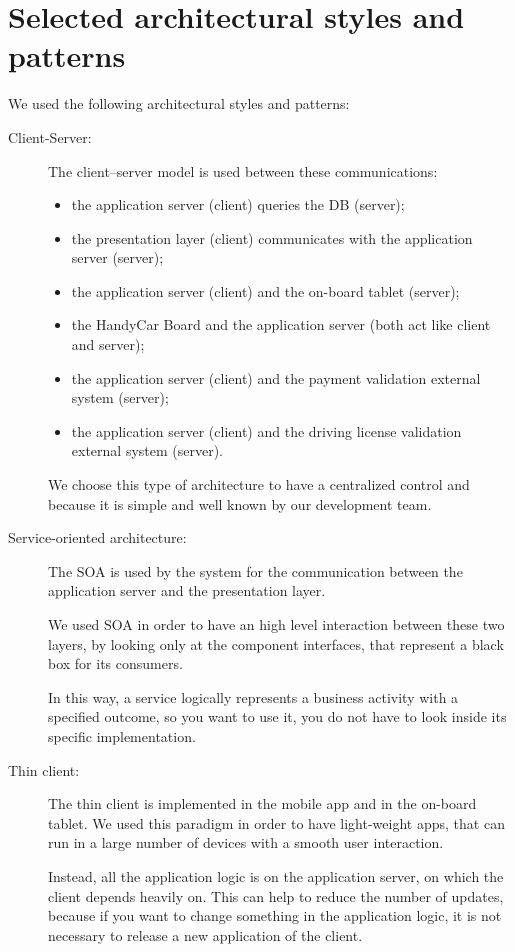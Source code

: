 \section{Selected architectural styles and patterns}
We used the following architectural styles and patterns:

\begin{description}
\item[Client-Server:]
The client–server model is used between these communications:
	\begin{itemize}
    \item the application server (client) queries the DB (server);
    \item the presentation layer (client) communicates with the application server (server);
    \item the application server (client) and the on-board tablet (server);
    \item the HandyCar Board and the application server (both act like client and server);
    \item the application server (client) and the payment validation external system (server);
    \item the application server (client) and the driving license validation external system (server).
	\end{itemize}

We choose this type of architecture to have a centralized control and because it is simple and well known by our development team.

\item[Service-oriented architecture:]
The SOA is used by the system for the communication between the application server and the presentation layer.

We used SOA in order to have an high level interaction between these two layers, by looking only at the component interfaces, that represent a black box for its consumers.

In this way, a service logically represents a business activity with a specified outcome, so you want to use it, you do not have to look inside its specific implementation.

\item[Thin client:]
The thin client is implemented in the mobile app and in the on-board tablet.
We used this paradigm in order to have light-weight apps, that can run in a large number of devices with a smooth user interaction.

Instead, all the application logic is on the application server, on which the client depends heavily on.
This can help to reduce the number of updates, because if you want to change something in the application logic, it is not necessary to release a new application of the client.

\end{description}
